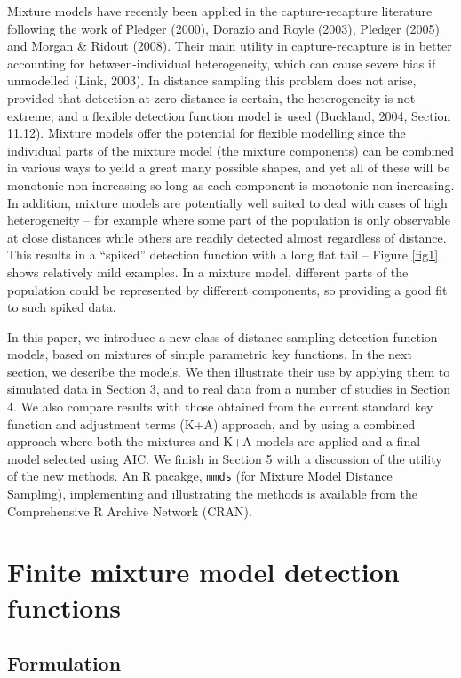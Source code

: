 \documentclass[useAMS,referee]{biom}
\begin{document}
Mixture models have recently been applied in the capture-recapture literature following the work of Pledger (2000), Dorazio and Royle (2003), Pledger (2005) and Morgan \& Ridout (2008). Their main utility in capture-recapture is in better accounting for between-individual heterogeneity, which can cause severe bias if unmodelled (Link, 2003). In distance sampling this problem does not arise, provided that detection at zero distance is certain, the heterogeneity is not extreme, and a flexible detection function model is used (Buckland, 2004, Section 11.12).  Mixture models offer the potential for flexible modelling since the individual parts of the mixture model (the mixture components) can be combined in various ways to yeild a great many possible shapes, and yet all of these will be monotonic non-increasing so long as each component is monotonic non-increasing.  In addition, mixture models are potentially well suited to deal with cases of high heterogeneity -- for example where some part of the population  is only observable at close distances while others are readily detected almost regardless of distance.  This results in a ``spiked'' detection function with a long flat tail -- Figure \ref{fig1} shows relatively mild examples.  In a mixture model, different parts of the population could be represented by different components, so providing a good fit to such spiked data. 

In this paper, we introduce a new class of distance sampling detection function models, based on mixtures of simple parametric key functions.  In the next section, we describe the models.  We then illustrate their use by applying them to simulated data in Section 3, and to real data from a number of studies in Section 4. We also compare results with those obtained from the current standard key function and adjustment terms (K+A) approach, and by using a combined approach where both the mixtures and K+A models are applied and a final model selected using AIC.  We finish in Section 5 with a discussion of the utility of the new methods.  An R pacakge, \texttt{mmds} (for Mixture Model Distance Sampling), implementing and illustrating the methods is available from the Comprehensive R Archive Network (CRAN).

\section{Finite mixture model detection functions}

\subsection{Formulation}
\label{s:detfcts}
\end{document}
